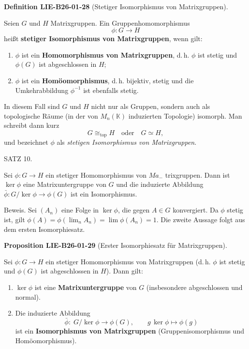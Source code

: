\documentclass[10pt, letterpaper]{article}
\newcommand{\CustomHeading}[3]{%
  \par\medskip\noindent%
  \textbf{#1 #2} \textnormal{(#3)}.\enskip%
}
\newenvironment{DEF}[2]{\begin{unitbox}\CustomHeading{Definition}{#1}{#2}}{\end{unitbox}}
\newenvironment{PROP}[2]{\begin{unitbox}\CustomHeading{Proposition}{#1}{#2}}{\end{unitbox}}
\begin{document}
\begin{DEF}{LIE-B26-01-28}{Stetiger Isomorphismus von Matrixgruppen}
Seien $G$ und $H$ Matrixgruppen.  
Ein Gruppenhomomorphismus
\[
\phi : G \longrightarrow H
\]
heißt \textbf{stetiger Isomorphismus von Matrixgruppen},  
wenn gilt:
\begin{enumerate}
  \item $\phi$ ist ein \textbf{Homomorphismus von Matrixgruppen}, d.\,h. $\phi$ ist stetig und $\phi(G)$ ist abgeschlossen in $H$;
  \item $\phi$ ist ein \textbf{Homöomorphismus}, d.\,h. bijektiv, stetig und die Umkehrabbildung $\phi^{-1}$ ist ebenfalls stetig.
\end{enumerate}

In diesem Fall sind $G$ und $H$ nicht nur als Gruppen, sondern auch als topologische Räume (in der von $M_n(\mathbb{K})$ induzierten Topologie) isomorph.  
Man schreibt dann kurz
\[
G \cong_{\text{top}} H
\quad \text{oder} \quad
G \simeq H,
\]
und bezeichnet $\phi$ als \emph{stetigen Isomorphismus von Matrixgruppen}.
\end{DEF}



SATZ 10. 

Sei $\phi: G \rightarrow H$ ein stetiger Homomorphismus von $M a_{-}$ trixgruppen. Dann ist $\operatorname{ker} \phi$ eine Matrixuntergruppe von $G$ und die induzierte Abbildung $\bar{\phi}: G / \operatorname{ker} \phi \rightarrow \phi(G)$ ist ein Isomorphismus.

Beweis. Sei $\left(A_{n}\right)$ eine Folge in $\operatorname{ker} \phi$, die gegen $A \in G$ konvergiert. Da $\phi$ stetig ist, gilt $\phi(A)=\phi\left(\lim _{n} A_{n}\right)=\lim \phi\left(A_{n}\right)=1$. Die zweite Aussage folgt aus dem ersten Isomorphiesatz.


\begin{PROP}{LIE-B26-01-29}{Erster Isomorphiesatz für Matrixgruppen}
Sei $\phi: G \to H$ ein stetiger Homomorphismus von Matrixgruppen
(d.\,h. $\phi$ ist stetig und $\phi(G)$ ist abgeschlossen in $H$). Dann gilt:
\begin{enumerate}
  \item $\ker\phi$ ist eine \textbf{Matrixuntergruppe} von $G$ (insbesondere abgeschlossen und normal).
  \item Die induzierte Abbildung
  \[
    \bar\phi:\; G/\ker\phi \longrightarrow \phi(G),\qquad g\,\ker\phi \longmapsto \phi(g)
  \]
  ist ein \textbf{Isomorphismus von Matrixgruppen} (Gruppenisomorphismus und Homöomorphismus).
\end{enumerate}
\end{PROP}
\end{document}
